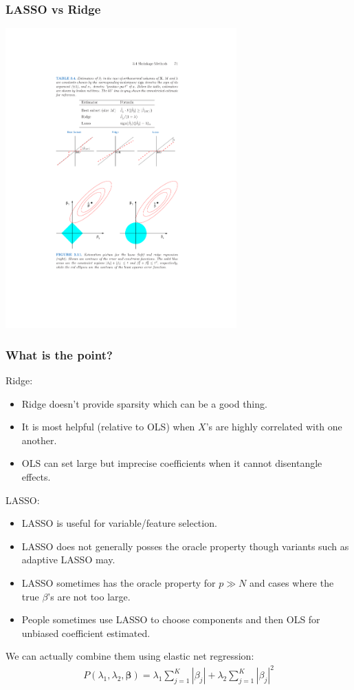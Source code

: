 \documentclass[xcolor=pdftex,dvipsnames,table,mathserif,aspectratio=169]{beamer}
\begin{document}
\begin{frame}
\frametitle{LASSO vs Ridge}
\begin{center}
\includegraphics[width=3.5in]{./resources/geometry}
\end{center}
\end{frame}

\begin{frame}
\frametitle{What is the point?}
Ridge:
\begin{itemize}
\item Ridge doesn't provide sparsity which can be a good thing.
\item It is most helpful (relative to OLS) when $X$'s are highly correlated with one another.
\item OLS can set large but imprecise coefficients when it cannot disentangle effects.
\end{itemize}
LASSO:
\begin{itemize}
\item LASSO is useful for variable/feature selection.
\item LASSO does not generally posses the \alert{oracle property} though variants such as \alert{adaptive LASSO} may.
\item LASSO sometimes has the oracle property for $p \gg N$ and cases where the true $\beta$'s are not too large.
\item People sometimes use LASSO to choose components and then OLS for unbiased coefficient estimated.
\end{itemize}
We can actually combine them using \alert{elastic net regression}:
\begin{eqnarray*}
 P(\lambda_1,\lambda_2,\mathbf{\beta}) =  \lambda _1\sum_{j=1}^K | \beta_j|  +\lambda_2 \sum_{j=1}^K | \beta_j|^2 
 \end{eqnarray*}
\end{frame}
\end{document}
